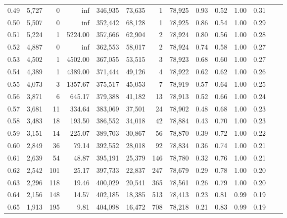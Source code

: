 \begin{tabular}{rrrrrrrrrrrrrr}
0.49 &  5,727 &      0 &      inf &  346,935 &   73,635 &       1 &  78,925 &  0.93 &  0.52 &  1.00 &      0.31 \\
0.50 &  5,507 &      0 &      inf &  352,442 &   68,128 &       1 &  78,925 &  0.86 &  0.54 &  1.00 &      0.29 \\
0.51 &  5,224 &      1 &  5224.00 &  357,666 &   62,904 &       2 &  78,924 &  0.80 &  0.56 &  1.00 &      0.28 \\
0.52 &  4,887 &      0 &      inf &  362,553 &   58,017 &       2 &  78,924 &  0.74 &  0.58 &  1.00 &      0.27 \\
0.53 &  4,502 &      1 &  4502.00 &  367,055 &   53,515 &       3 &  78,923 &  0.68 &  0.60 &  1.00 &      0.27 \\
0.54 &  4,389 &      1 &  4389.00 &  371,444 &   49,126 &       4 &  78,922 &  0.62 &  0.62 &  1.00 &      0.26 \\
0.55 &  4,073 &      3 &  1357.67 &  375,517 &   45,053 &       7 &  78,919 &  0.57 &  0.64 &  1.00 &      0.25 \\
0.56 &  3,871 &      6 &   645.17 &  379,388 &   41,182 &      13 &  78,913 &  0.52 &  0.66 &  1.00 &      0.24 \\
0.57 &  3,681 &     11 &   334.64 &  383,069 &   37,501 &      24 &  78,902 &  0.48 &  0.68 &  1.00 &      0.23 \\
0.58 &  3,483 &     18 &   193.50 &  386,552 &   34,018 &      42 &  78,884 &  0.43 &  0.70 &  1.00 &      0.23 \\
0.59 &  3,151 &     14 &   225.07 &  389,703 &   30,867 &      56 &  78,870 &  0.39 &  0.72 &  1.00 &      0.22 \\
0.60 &  2,849 &     36 &    79.14 &  392,552 &   28,018 &      92 &  78,834 &  0.36 &  0.74 &  1.00 &      0.21 \\
0.61 &  2,639 &     54 &    48.87 &  395,191 &   25,379 &     146 &  78,780 &  0.32 &  0.76 &  1.00 &      0.21 \\
0.62 &  2,542 &    101 &    25.17 &  397,733 &   22,837 &     247 &  78,679 &  0.29 &  0.78 &  1.00 &      0.20 \\
0.63 &  2,296 &    118 &    19.46 &  400,029 &   20,541 &     365 &  78,561 &  0.26 &  0.79 &  1.00 &      0.20 \\
0.64 &  2,156 &    148 &    14.57 &  402,185 &   18,385 &     513 &  78,413 &  0.23 &  0.81 &  0.99 &      0.19 \\
0.65 &  1,913 &    195 &     9.81 &  404,098 &   16,472 &     708 &  78,218 &  0.21 &  0.83 &  0.99 &      0.19 \\

\end{tabular}
